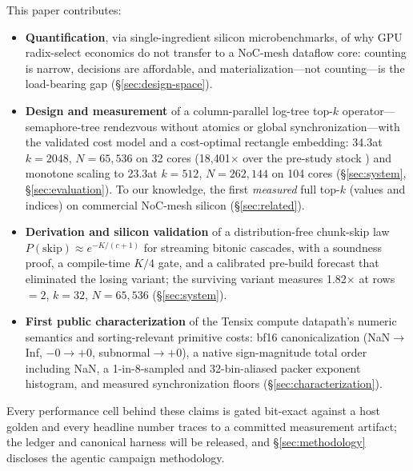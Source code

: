 This paper contributes:
\begin{itemize}
\item \textbf{Quantification}, via single-ingredient silicon
  microbenchmarks, of why GPU radix-select economics do not transfer to
  a NoC-mesh dataflow core: counting is narrow, decisions are
  affordable, and materialization---not counting---is the load-bearing
  gap (\S\ref{sec:design-space}).
\item \textbf{Design and measurement} of a column-parallel log-tree top-$k$
  operator---semaphore-tree rendezvous without
  atomics or global synchronization---with the validated cost model
  \costmodel and a cost-optimal rectangle embedding: 34.3\us at $k{=}2048$,
  $N{=}65{,}536$ on 32 cores (18{,}401$\times$ over the pre-study stock
  \ttnntopk) and monotone scaling to 23.3\us at $k{=}512$, $N{=}262{,}144$
  on 104 cores (\S\ref{sec:system}, \S\ref{sec:evaluation}). To our
  knowledge, the first \emph{measured} full top-$k$ (values and indices) on
  commercial NoC-mesh silicon (\S\ref{sec:related}).
\item \textbf{Derivation and silicon validation} of a distribution-free
  chunk-skip law $P(\mathrm{skip}) \approx e^{-K/(c+1)}$
  for streaming bitonic cascades, with a soundness proof, a compile-time
  $K/4$ gate, and a calibrated pre-build forecast that eliminated the losing
  variant; the surviving variant measures 1.82$\times$ at
  rows${=}2$, $k{=}32$, $N{=}65{,}536$ (\S\ref{sec:system}).
\item \textbf{First public characterization} of the Tensix compute
  datapath's numeric semantics and sorting-relevant primitive costs: bf16
  canonicalization (NaN$\to$Inf, $-0\to{+}0$, subnormal$\to{+}0$), a native
  sign-magnitude total order including NaN, a 1-in-8-sampled and
  32-bin-aliased packer exponent histogram, and measured synchronization
  floors (\S\ref{sec:characterization}).
\end{itemize}

Every performance cell behind these claims is gated bit-exact against a host
golden and every headline number traces to
a committed measurement artifact; the ledger and canonical harness
will be released, and \S\ref{sec:methodology} discloses the agentic
campaign methodology.
